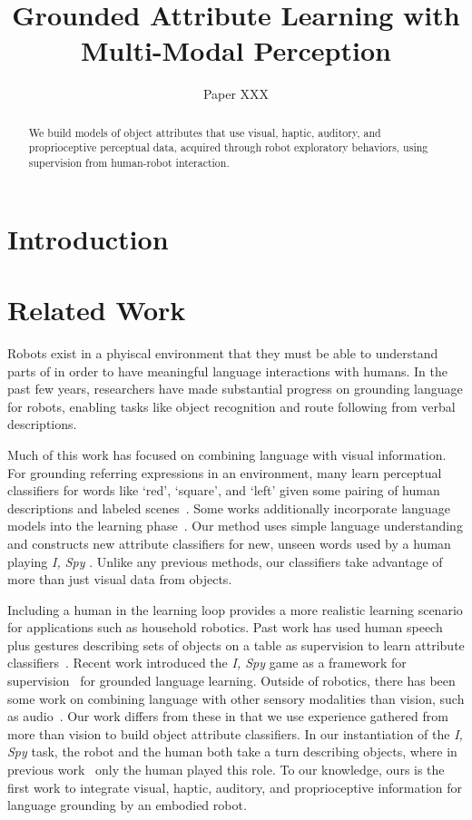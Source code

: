 \documentclass{article}
\title{Grounded Attribute Learning with Multi-Modal Perception}
\author{Paper XXX}
\newcommand{\ispy}{\textit{I, Spy} }
\begin{document}
\maketitle

\begin{abstract}
	We build models of object attributes that use visual, haptic, auditory, and proprioceptive perceptual data, acquired through robot exploratory behaviors, using supervision from human-robot interaction.
\end{abstract}

\section{Introduction}

\section{Related Work}

	Robots exist in a phyiscal environment that they must be able to understand parts of in order to have meaningful language interactions with humans. In the past few years, researchers have made substantial progress on grounding language for robots, enabling tasks like object recognition and route following from verbal descriptions.

	Much of this work has focused on combining language with visual information. For grounding referring expressions in an environment, many learn perceptual classifiers for words like `red', `square', and `left' given some pairing of human descriptions and labeled scenes~\cite{liu:acl14,malinowski:nips14,mohan:acs13,sun:icra13,dindo:iros10}. Some works additionally incorporate language models into the learning phase~\cite{spranger:ijcai15,krishnamurthy:acl13,perera:aaai13,matuszek:icml12}. Our method uses simple language understanding and constructs new attribute classifiers for new, unseen words used by a human playing \ispy. Unlike any previous methods, our classifiers take advantage of more than just visual data from objects.

	Including a human in the learning loop provides a more realistic learning scenario for applications such as household robotics. Past work has used human speech plus gestures describing sets of objects on a table as supervision to learn attribute classifiers~\cite{matuszek:aaai14,kollar:rss13}. Recent work introduced the \ispy game as a framework for supervision~\cite{parde:ijcai15} for grounded language learning. Outside of robotics, there has been some work on combining language with other sensory modalities than vision, such as audio~\cite{kiela:emnlp15}. Our work differs from these in that we use experience gathered from more than vision to build object attribute classifiers. In our instantiation of the \ispy task, the robot and the human both take a turn describing objects, where in previous work~ only the human played this role. To our knowledge, ours is the first work to integrate visual, haptic, auditory, and proprioceptive information for language grounding by an embodied robot.
\end{document}
